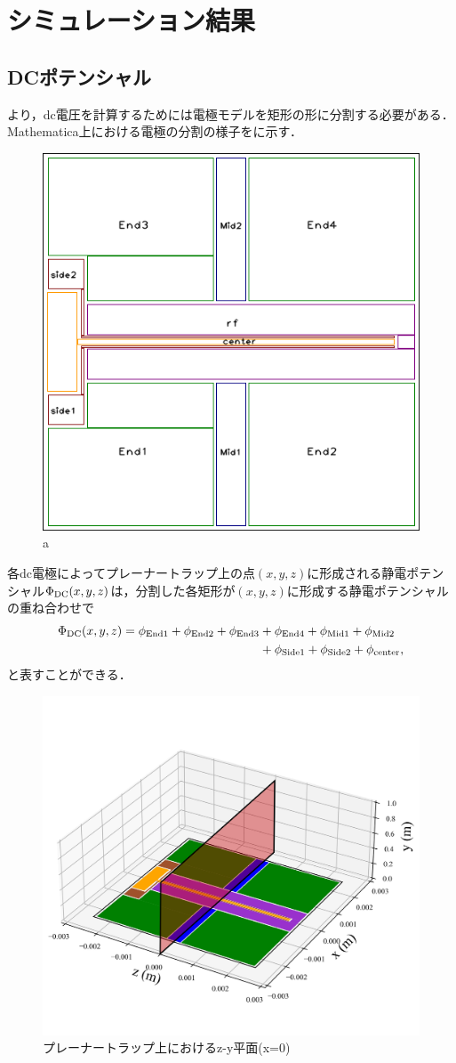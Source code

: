 \chapter{シミュレーション結果}
\section{DCポテンシャル}
より，dc電圧を計算するためには電極モデルを矩形の形に分割する必要がある．Mathematica上における電極の分割の様子をに示す．
\begin{figure}[h]
	\begin{center}
		\includegraphics[width = 0.4\linewidth]{./simulation/figure/named_rect_electrode.png}
	\end{center}
	\caption{a}
	\label{fig:rect_electrode}
\end{figure}
各dc電極によってプレーナートラップ上の点$(x,y,z)$に形成される静電ポテンシャル$\Phi_{\rm DC}(x,y,z)$は，分割した各矩形が$(x,y,z)$に形成する静電ポテンシャルの重ね合わせで
\large
\begin{align}
	\Phi_{\rm DC}(x,y,z) = \phi_{\rm End1} + \phi_{\rm End2} + \phi_{\rm End3} &+ \phi_{\rm End4} + \phi_{\rm Mid1} + \phi_{\rm Mid2} \notag \\
	&+ \phi_{\rm Side1} + \phi_{\rm Side2} + \phi_{\rm center},
\end{align}
\normalsize
と表すことができる．
\begin{figure}[h]
	\begin{center}
		\includegraphics[width = 0.7\linewidth]{./simulation/figure/PlannarTrap_3D_z=0.png}
		\caption{プレーナートラップ上におけるz-y平面(x=0)}
	\end{center}
\end{figure}
